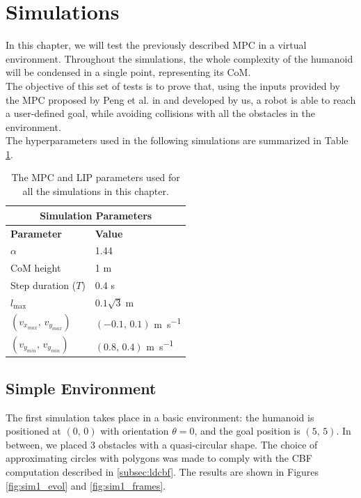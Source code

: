 \section{Simulations}\label{sec:simulations}

In this chapter, we will test the previously described MPC in a virtual environment. Throughout the simulations, the whole complexity of the humanoid will be condensed in a single point, representing its CoM.\\
The objective of this set of tests is to prove that, using the inputs provided by the MPC proposed by Peng et al. in \cite{peng_main_paper} and developed by us, a robot is able to reach a user-defined goal, while avoiding collisions with all the obstacles in the environment.\\
The hyperparameters used in the following simulations are summarized in Table \ref{table:sim_params}.

\begin{table}[h]
        \begin{tabular}{ |p{4cm}||p{4cm}| }
             \hline
             \multicolumn{2}{|c|}{Simulation Parameters} \\
             \hline
             \textbf{Parameter} & \textbf{Value}\\
             \hline
             $\alpha$   & 1.44 \\
             CoM height & 1 \si{\meter} \\
             Step duration ($T$) & 0.4 \si{\second} \\
             $l_{\max}$ & $0.1 \sqrt{3} \;\si{\meter}$ \\
             $\left( v_{x_{max}},\, v_{y_{max}} \right)$ & $\left( -0.1,\, 0.1 \right)$ \si{\meter\per\second}\\
             $\left( v_{y_{min}},\, v_{y_{min}} \right)$ & $\left( 0.8,\, 0.4 \right)$ \si{\meter\per\second}\\
             \hline
        \end{tabular}
    \centering
    \caption{The MPC and LIP parameters used for all the simulations in this chapter.}
    \label{table:sim_params}
\end{table}

\subsection{Simple Environment}\label{subsec:sim_simple_env}
The first simulation takes place in a basic environment: the humanoid is positioned at $(0,\,0)$ with orientation $\theta = 0$, and the goal position is $(5,\,5)$. In between, we placed 3 obstacles with a quasi-circular shape. The choice of approximating circles with polygons was made to comply with the CBF computation described in \ref{subsec:ldcbf}. The results are shown in Figures \ref{fig:sim1_evol} and \ref{fig:sim1_frames}.

